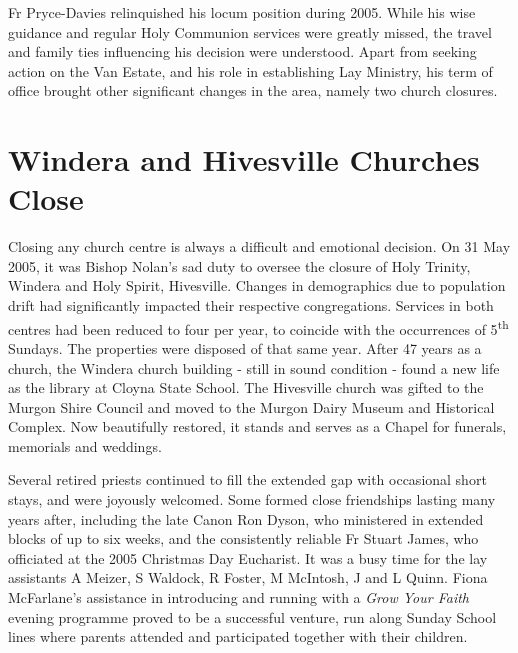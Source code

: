 Fr Pryce-Davies relinquished his locum position during 2005. While his wise guidance and regular Holy Communion services were greatly missed, the travel and family ties influencing his decision were understood. Apart from seeking action on the Van Estate, and his role in establishing Lay Ministry, his term of office brought other significant changes in the area, namely two church closures.



\section{Windera and Hivesville Churches Close}



Closing any church centre is always a difficult and emotional decision. On 31 May 2005, it was Bishop Nolan's sad duty to oversee the closure of Holy Trinity, Windera and Holy Spirit, Hivesville. Changes in demographics due to population drift had significantly impacted their respective congregations. Services in both centres had been reduced to four per year, to coincide with the occurrences of 5\textsuperscript{th} Sundays. The properties were disposed of that same year. After 47 years as a church, the Windera church building - still in sound condition - found a new life as the library at Cloyna State School. The Hivesville church was gifted to the Murgon Shire Council and moved to the Murgon Dairy Museum and Historical Complex. Now beautifully restored, it stands and serves as a Chapel for funerals, memorials and weddings.



Several retired priests continued to fill the extended gap with occasional short stays, and were joyously welcomed. Some formed close friendships lasting many years after, including the late Canon Ron Dyson, who ministered in extended blocks of up to six weeks, and the consistently reliable Fr Stuart James, who officiated at the 2005 Christmas Day Eucharist. It was a busy time for the lay assistants A Meizer, S Waldock, R Foster, M McIntosh, J and L Quinn. Fiona McFarlane's assistance in introducing and running with a \emph{Grow Your Faith} evening programme proved to be a successful venture, run along Sunday School lines where parents attended and participated together with their children.



